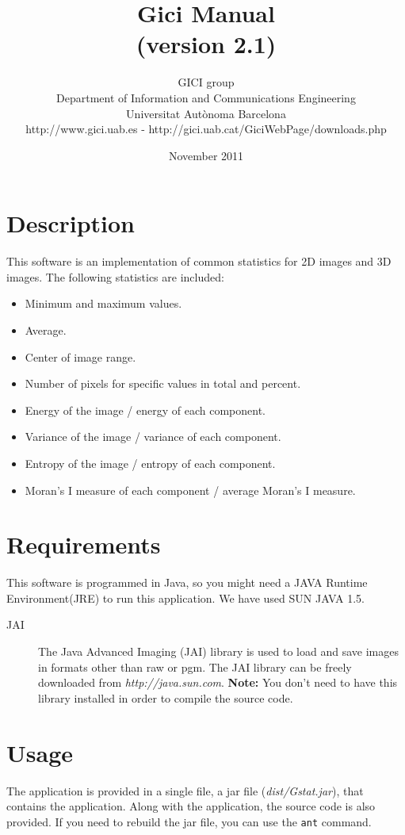 \documentclass[a4paper,10pt]{article}
\title{Gici \me{} Manual \\ \small (version 2.1)}
\author{
GICI group \vspace{0.1cm} \\
\small Department of Information and Communications Engineering \\
\small Universitat Aut{\`o}noma Barcelona \\
\small http://www.gici.uab.es  -  http://gici.uab.cat/GiciWebPage/downloads.php \\
}
\date{November 2011}
\newcommand{\me}{Gstat\relax }
\begin{document}
\maketitle

\section{Description}

This software is an implementation of common statistics for 2D images and 3D images. The following statistics are included:

\begin{itemize}
\item Minimum and maximum values.
\item Average.
\item Center of image range.
\item Number of pixels for specific values in total and percent.
\item Energy of the image / energy of each component.
\item Variance of the image / variance of each component.
\item Entropy of the image / entropy of each component.
\item Moran's I measure of each component / average Moran's I measure.
\end{itemize}

\section{Requirements}

This software is programmed in Java, so you might need a JAVA Runtime Environment(JRE) to run this application.
We have used SUN JAVA 1.5. 

\begin{description}
\item[JAI] The Java Advanced Imaging (JAI) library is used to load and save images in formats
other than raw or pgm. The JAI library can be freely downloaded from \emph{http://java.sun.com}.
\textbf{Note:} You don't need to have this library installed in order to compile the source code.
\end{description}

\section{Usage}

The application is provided in a single file, a jar file (\emph{dist/\me{}.jar}), that contains the application.
Along with the application, the source code is also provided. If you need to rebuild the jar file, you can use the \texttt{ant} command.
\end{document}
